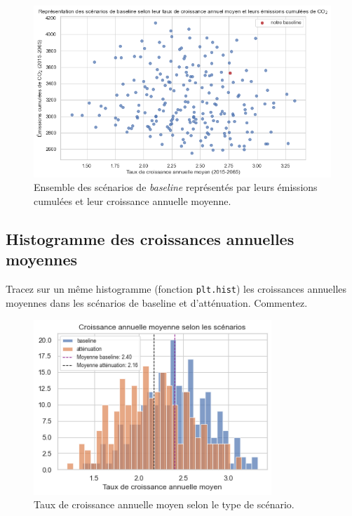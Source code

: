 \documentclass[a4,11pt]{aleph-notas}
\newcommand{\ans}[1]{
\begin{mdframed}[
    roundcorner=10pt,     %
    backgroundcolor=gray!20, %
    linecolor=black,      %
    linewidth=1pt,        %
    innertopmargin=10pt,  %
    innerbottommargin=10pt, %
    innerleftmargin=10pt,  %
    innerrightmargin=10pt  %
]
#1
\end{mdframed}
}
\begin{document}
\begin{figure}[H]
    \centering
    \includegraphics[width=\textwidth]{images_IMACLIM/baselines_scenarios.png}
    \caption{Ensemble des scénarios de \textit{baseline} représentés par leurs émissions cumulées et leur croissance annuelle moyenne.}
    \label{fig:baselines_scenarios}
\end{figure}


\subsection{Histogramme des croissances annuelles moyennes}
\ans{Tracez sur un même histogramme (fonction \texttt{plt.hist}) les croissances annuelles \\
moyennes dans les scénarios de baseline et d’atténuation. Commentez.}

\begin{figure}[H]
    \centering
    \includegraphics[width=0.8\textwidth]{images_IMACLIM/histo_growth.png}
    \caption{Taux de croissance annuelle moyen selon le type de scénario.}
    \label{histo_growth}
\end{figure}
\end{document}
